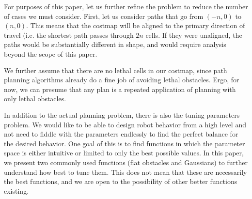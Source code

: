 For purposes of this paper, let us further refine the problem to reduce the number of cases we must consider. First, let us consider paths that go from $(-n, 0)$ to $(n, 0)$. This means that the costmap will be aligned to the primary direction of travel (i.e. the shortest path passes through $2n$ cells. If they were unaligned, the paths would be substantially different in shape, and would require analysis beyond the scope of this paper. 

We further assume that there are no lethal cells in our costmap, since path planning algorithms already do a fine job of avoiding lethal obstacles. Ergo, for now, we can presume that any plan is a repeated application of planning with only lethal obstacles. 



In addition to the actual planning problem, there is also the tuning parameters problem. We would like to be able to design robot behavior from a high level and not need to fiddle with the parameters endlessly to find the perfect balance for the desired behavior. One goal of this is to find functions in which the parameter space is either intuitive or limited to only the best possible values. In this paper, we present two commonly used functions (flat obstacles and Gaussians) to further understand how best to tune them. This does not mean that these are necessarily the best functions, and we are open to the possibility of other better functions existing. 


